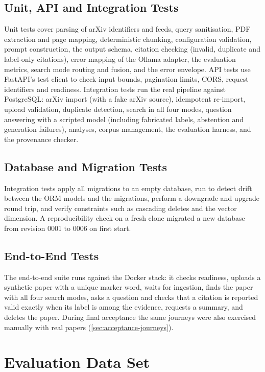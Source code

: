 \subsection{Unit, API and Integration Tests}

Unit tests cover parsing of arXiv identifiers and feeds, query sanitisation, PDF extraction and page mapping,
deterministic chunking, configuration validation, prompt construction, the output schema, citation checking
(invalid, duplicate and label-only citations), error mapping of the Ollama adapter, the evaluation metrics, search
mode routing and fusion, and the error envelope. API tests use FastAPI's test client to check input bounds,
pagination limits, CORS, request identifiers and readiness. Integration tests run the real pipeline against
PostgreSQL: arXiv import (with a fake arXiv source), idempotent re-import, upload validation, duplicate detection,
search in all four modes, question answering with a scripted model (including fabricated labels, abstention and
generation failures), analyses, corpus management, the evaluation harness, and the provenance checker.

\subsection{Database and Migration Tests}

Integration tests apply all migrations to an empty database, run  to detect drift between the
ORM models and the migrations, perform a downgrade and upgrade round trip, and verify constraints such as cascading
deletes and the vector dimension. A reproducibility check on a fresh clone migrated a new database from revision
0001 to 0006 on first start.

\subsection{End-to-End Tests}

The end-to-end suite runs against the Docker stack: it checks readiness, uploads a synthetic paper with a unique
marker word, waits for ingestion, finds the paper with all four search modes, asks a question and checks that a
citation is reported valid exactly when its label is among the evidence, requests a summary, and deletes the paper.
During final acceptance the same journeys were also exercised manually with real papers
(\autoref{sec:acceptance-journeys}).

\section{Evaluation Data Set}

